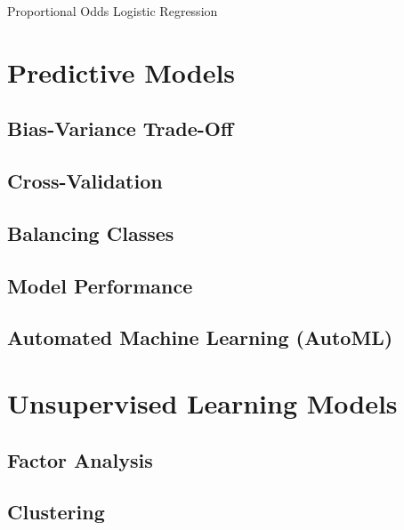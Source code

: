 \documentclass[]{book}
\begin{document}
Proportional Odds Logistic Regression

\hypertarget{predictive-models}{%
\chapter{Predictive Models}\label{predictive-models}}

\hypertarget{bias-variance-trade-off}{%
\section{Bias-Variance Trade-Off}\label{bias-variance-trade-off}}

\hypertarget{cross-validation}{%
\section{Cross-Validation}\label{cross-validation}}

\hypertarget{balancing-classes}{%
\section{Balancing Classes}\label{balancing-classes}}

\hypertarget{model-performance}{%
\section{Model Performance}\label{model-performance}}

\hypertarget{automated-machine-learning-automl}{%
\section{Automated Machine Learning (AutoML)}\label{automated-machine-learning-automl}}

\hypertarget{unsupervised-learning-models}{%
\chapter{Unsupervised Learning Models}\label{unsupervised-learning-models}}

\hypertarget{factor-analysis}{%
\section{Factor Analysis}\label{factor-analysis}}

\hypertarget{clustering}{%
\section{Clustering}\label{clustering}}
\end{document}
